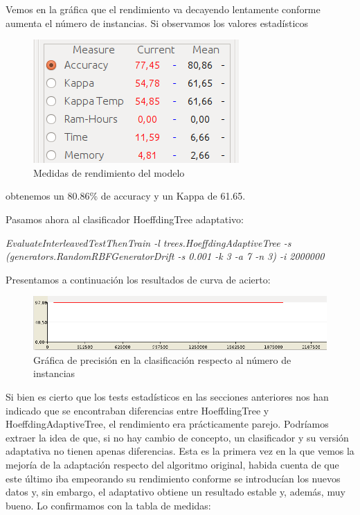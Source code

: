 Vemos en la gráfica que el rendimiento va decayendo lentamente conforme aumenta el número de instancias. Si observamos los valores estadísticos

\begin{figure}[H] %
	\centering
	\includegraphics[scale=0.5]{cd2.png}  %
	\caption{Medidas de rendimiento del modelo} 
	\label{fig:cd2}
\end{figure}

obtenemos un 80.86\% de accuracy y un Kappa de 61.65.

Pasamos ahora al clasificador HoeffdingTree adaptativo:

\textit{EvaluateInterleavedTestThenTrain -l trees.HoeffdingAdaptiveTree -s \\ (generators.RandomRBFGeneratorDrift -s 0.001 -k 3 -a 7 -n 3) -i 2000000}

Presentamos a continuación los resultados de curva de acierto:

\begin{figure}[H] %
	\centering
	\includegraphics[scale=0.4]{cd3.png}  %
	\caption{Gráfica de precisión en la clasificación respecto al número de instancias} 
	\label{fig:cd3}
\end{figure}

Si bien es cierto que los tests estadísticos en las secciones anteriores nos han indicado que se encontraban diferencias entre HoeffdingTree y HoeffdingAdaptiveTree, el rendimiento era prácticamente parejo. Podríamos extraer la idea de que, si no hay cambio de concepto, un clasificador y su versión adaptativa no tienen apenas diferencias. Esta es la primera vez en la que vemos la mejoría de la adaptación respecto del algoritmo original, habida cuenta de que este último iba empeorando su rendimiento conforme se introducían los nuevos datos y, sin embargo, el adaptativo obtiene un resultado estable y, además, muy bueno. Lo confirmamos con la tabla de medidas:

